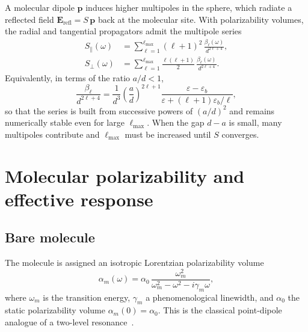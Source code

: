 \documentclass[11pt,a4paper]{article}
\begin{document}
A molecular dipole $\mathbf{p}$ induces higher multipoles in the sphere, which
radiate a reflected field $\mathbf{E}_{\mathrm{refl}}=S\,\mathbf{p}$ back at the
molecular site.  With polarizability volumes, the radial and tangential
propagators admit the multipole series~\citep{gersten1980,gersten1981,ruppin1982}
\begin{align}
  S_\parallel(\omega)
  &=
  \sum_{\ell=1}^{\ell_{\max}}
  (\ell+1)^2\,
  \frac{\beta_\ell(\omega)}{d^{2\ell+4}},
  \label{eq:Spar} \\[0.35em]
  S_\perp(\omega)
  &=
  \sum_{\ell=1}^{\ell_{\max}}
  \frac{\ell(\ell+1)}{2}\,
  \frac{\beta_\ell(\omega)}{d^{2\ell+4}}.
  \label{eq:Sperp}
\end{align}
Equivalently, in terms of the ratio $a/d<1$,
\begin{equation}
  \frac{\beta_\ell}{d^{2\ell+4}}
  =
  \frac{1}{d^3}
  \left(\frac{a}{d}\right)^{2\ell+1}
  \frac{\varepsilon-\varepsilon_b}{\varepsilon+(\ell+1)\varepsilon_b/\ell},
\end{equation}
so that the series is built from successive powers of $(a/d)^2$ and remains
numerically stable even for large $\ell_{\max}$.  When the gap $d-a$ is small,
many multipoles contribute and $\ell_{\max}$ must be increased until $S$ converges.

\section{Molecular polarizability and effective response}
\label{sec:molecule}

\subsection{Bare molecule}

The molecule is assigned an isotropic Lorentzian polarizability volume
\begin{equation}
  \alpha_m(\omega)
  =
  \alpha_0\,
  \frac{\omega_m^2}{\omega_m^2 - \omega^2 - i\gamma_m\omega},
  \label{eq:alpham}
\end{equation}
where $\omega_m$ is the transition energy, $\gamma_m$ a phenomenological
linewidth, and $\alpha_0$ the static polarizability volume
$\alpha_m(0)=\alpha_0$.  This is the classical point-dipole analogue of a
two-level resonance~\citep{jackson1999,novotny2012}.
\end{document}
